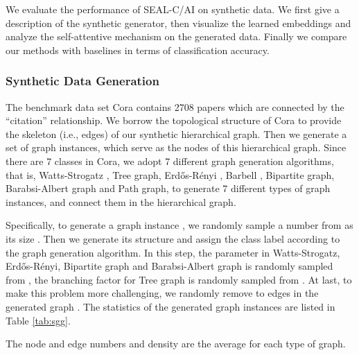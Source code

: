 \documentclass[sigconf]{acmart}
\begin{document}
We evaluate the performance of SEAL-C/AI on synthetic data.  We first give a description of the synthetic generator, then visualize the learned embeddings and analyze the self-attentive mechanism on the generated data.  Finally we compare our methods with baselines in terms of classification accuracy.

\subsubsection{Synthetic Data Generation}

The benchmark data set Cora \cite{mccallum2000automating} contains 2708 papers which are connected by the ``citation'' relationship.  We borrow the topological structure of Cora to provide the skeleton (i.e., edges) of our synthetic hierarchical graph.  Then we generate a set of graph instances, which serve as the nodes of this hierarchical graph.  Since there are 7 classes in Cora, we adopt 7 different graph generation algorithms, that is, Watts-Strogatz \cite{watts1998collective}, Tree graph, Erd{\H o}s-R{\'e}nyi \cite{erdos1960evolution}, Barbell \cite{herbster2007prediction}, Bipartite graph, Barabsi-Albert graph \cite{bollobas2003mathematical} and Path graph, to generate 7 different types of graph instances, and connect them in the hierarchical graph.

Specifically, to generate a graph instance , we randomly sample a number from  as its size .  Then we generate its structure and assign the class label according to the graph generation algorithm.  In this step, the parameter  in Watts-Strogatz, Erd{\H o}s-R{\'e}nyi, Bipartite graph and Barabsi-Albert graph is randomly sampled from , the branching factor for Tree graph is randomly sampled from .  At last, to make this problem more challenging, we randomly remove  to  edges in the generated graph .  The statistics of the generated graph instances are listed in Table \ref{tab:sgg}.

\begin{table}
  \caption{Statistics of generated graph instances}
  \label{tab:sgg}
\raggedright{The node and edge numbers and density are the average for each type of graph.}
\vspace{-0.3cm}
\end{table}
\end{document}
